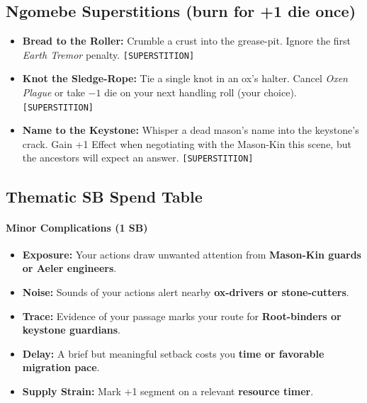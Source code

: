 \subsection*{Ngomebe Superstitions (burn for +1 die once)}
\begin{itemize}
  \item \textbf{Bread to the Roller:} Crumble a crust into the grease-pit. Ignore the first \emph{Earth Tremor} penalty. \texttt{[SUPERSTITION]}
  \item \textbf{Knot the Sledge-Rope:} Tie a single knot in an ox's halter. Cancel \emph{Oxen Plague} or take $-1$ die on your next handling roll (your choice). \texttt{[SUPERSTITION]}
  \item \textbf{Name to the Keystone:} Whisper a dead mason's name into the keystone's crack. Gain +1 Effect when negotiating with the Mason-Kin this scene, but the ancestors will expect an answer. \texttt{[SUPERSTITION]}
\end{itemize}

\subsection*{Thematic SB Spend Table}
\label{sec:ngomebe-sb}

\paragraph{Minor Complications (1 SB)}
\begin{itemize}
\item \textbf{Exposure:} Your actions draw unwanted attention from \textbf{Mason-Kin guards or Aeler engineers}.
\item \textbf{Noise:} Sounds of your actions alert nearby \textbf{ox-drivers or stone-cutters}.
\item \textbf{Trace:} Evidence of your passage marks your route for \textbf{Root-binders or keystone guardians}.
\item \textbf{Delay:} A brief but meaningful setback costs you \textbf{time or favorable migration pace}.
\item \textbf{Supply Strain:} Mark +1 segment on a relevant \textbf{resource timer}.
\end{itemize}

